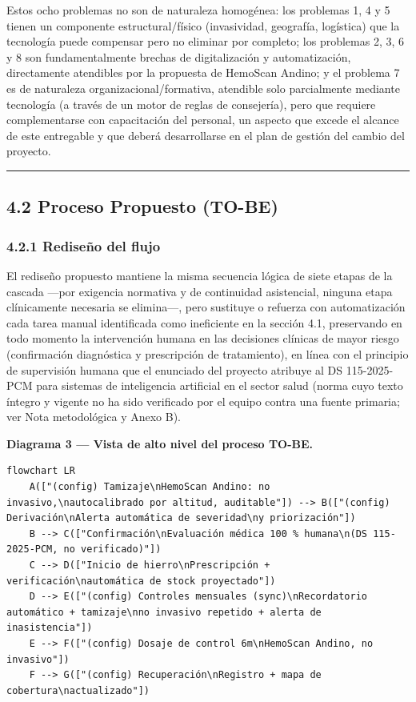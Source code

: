 \documentclass[11pt,a4paper]{article}
\begin{document}
Estos ocho problemas no son de naturaleza homogénea: los problemas 1, 4 y 5 tienen un componente estructural/físico (invasividad, geografía, logística) que la tecnología puede compensar pero no eliminar por completo; los problemas 2, 3, 6 y 8 son fundamentalmente brechas de digitalización y automatización, directamente atendibles por la propuesta de HemoScan Andino; y el problema 7 es de naturaleza organizacional/formativa, atendible solo parcialmente mediante tecnología (a través de un motor de reglas de consejería), pero que requiere complementarse con capacitación del personal, un aspecto que excede el alcance de este entregable y que deberá desarrollarse en el plan de gestión del cambio del proyecto.

\begin{center}\rule{0.5\linewidth}{0.5pt}\end{center}

\subsection{4.2 Proceso Propuesto (TO-BE)}\label{proceso-propuesto-to-be}

\subsubsection{4.2.1 Rediseño del flujo}\label{rediseuxf1o-del-flujo}

El rediseño propuesto mantiene la misma secuencia lógica de siete etapas de la cascada ---por exigencia normativa y de continuidad asistencial, ninguna etapa clínicamente necesaria se elimina---, pero sustituye o refuerza con automatización cada tarea manual identificada como ineficiente en la sección 4.1, preservando en todo momento la intervención humana en las decisiones clínicas de mayor riesgo (confirmación diagnóstica y prescripción de tratamiento), en línea con el principio de supervisión humana que el enunciado del proyecto atribuye al DS 115-2025-PCM para sistemas de inteligencia artificial en el sector salud (norma cuyo texto íntegro y vigente no ha sido verificado por el equipo contra una fuente primaria; ver Nota metodológica y Anexo B).

\textbf{Diagrama 3 --- Vista de alto nivel del proceso TO-BE.}

\begin{samepage}\begin{verbatim}
flowchart LR
    A(["(config) Tamizaje\nHemoScan Andino: no invasivo,\nautocalibrado por altitud, auditable"]) --> B(["(config) Derivación\nAlerta automática de severidad\ny priorización"])
    B --> C(["Confirmación\nEvaluación médica 100 % humana\n(DS 115-2025-PCM, no verificado)"])
    C --> D(["Inicio de hierro\nPrescripción + verificación\nautomática de stock proyectado"])
    D --> E(["(config) Controles mensuales (sync)\nRecordatorio automático + tamizaje\nno invasivo repetido + alerta de inasistencia"])
    E --> F(["(config) Dosaje de control 6m\nHemoScan Andino, no invasivo"])
    F --> G(["(config) Recuperación\nRegistro + mapa de cobertura\nactualizado"])
\end{verbatim}\end{samepage}
\end{document}
